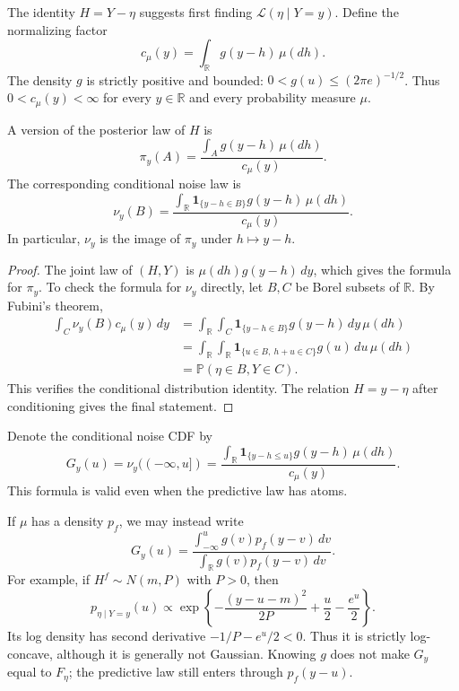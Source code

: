 The identity $H=Y-\eta$ suggests first finding $\mathcal L(\eta\mid Y=y)$.
Define the normalizing factor
\[
c_\mu(y)=\int_\mathbb R g(y-h)\,\mu(dh).
\]
The density $g$ is strictly positive and bounded:
$0<g(u)\le (2\pi e)^{-1/2}$. Thus
$0<c_\mu(y)<\infty$ for every $y\in\mathbb R$ and every probability measure $\mu$.

\begin{proposition}
A version of the posterior law of $H$ is
\[
\pi_y(A)=\frac{\int_A g(y-h)\,\mu(dh)}{c_\mu(y)}.
\]
The corresponding conditional noise law is
\begin{equation}
\nu_y(B)
=\frac{\int_\mathbb R
\mathbf 1_{\{y-h\in B\}}g(y-h)\,\mu(dh)}{c_\mu(y)}.
\label{eq:noise-transport:conditional-noise}
\end{equation}
In particular, $\nu_y$ is the image of $\pi_y$ under $h\mapsto y-h$.
\end{proposition}

\begin{proof}
The joint law of $(H,Y)$ is $\mu(dh)g(y-h)\,dy$, which gives the
formula for $\pi_y$. To check the formula for $\nu_y$ directly, let
$B,C$ be Borel subsets of $\mathbb R$. By Fubini's theorem,
\begin{align*}
\int_C \nu_y(B)c_\mu(y)\,dy
&=\int_\mathbb R\int_C
\mathbf 1_{\{y-h\in B\}}g(y-h)\,dy\,\mu(dh)\\
&=\int_\mathbb R\int_\mathbb R
\mathbf 1_{\{u\in B,\ h+u\in C\}}g(u)\,du\,\mu(dh)\\
&=\mathbb P(\eta\in B,Y\in C).
\end{align*}
This verifies the conditional distribution identity. The relation
$H=y-\eta$ after conditioning gives the final statement.
\end{proof}

Denote the conditional noise CDF by
\begin{equation}
G_y(u)=\nu_y((-\infty,u])
=\frac{\int_\mathbb R
\mathbf 1_{\{y-h\le u\}}g(y-h)\,\mu(dh)}{c_\mu(y)}.
\label{eq:noise-transport:conditional-cdf}
\end{equation}
This formula is valid even when the predictive law has atoms.

If $\mu$ has a density $p_f$, we may instead write
\[
G_y(u)=
\frac{\int_{-\infty}^u g(v)p_f(y-v)\,dv}
{\int_\mathbb R g(v)p_f(y-v)\,dv}.
\]
For example, if $H^f\sim N(m,P)$ with $P>0$, then
\[
p_{\eta\mid Y=y}(u)
\propto
\exp\left\{-\frac{(y-u-m)^2}{2P}
+\frac u2-\frac{e^u}{2}\right\}.
\]
Its log density has second derivative $-1/P-e^u/2<0$.
Thus it is strictly log-concave, although it is generally not Gaussian.
Knowing $g$ does not make $G_y$ equal to $F_\eta$; the predictive law
still enters through $p_f(y-u)$.

